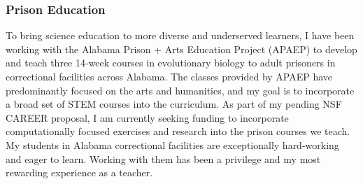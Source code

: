 \subsubsection*{Prison Education}
To bring science education to more diverse and underserved learners,
I have been working with
the Alabama Prison + Arts Education Project (APAEP) to develop and teach three
14-week courses in evolutionary biology to adult prisoners in correctional
facilities across Alabama.
The classes provided by APAEP have predominantly focused on the
arts and humanities, and
my
goal is to incorporate a broad set of STEM courses into the
curriculum.
As part of my pending NSF CAREER proposal, I am currently
seeking funding to incorporate computationally focused
exercises and research into the prison courses we teach.
My students in Alabama correctional facilities are exceptionally hard-working
and eager to learn.
Working with them has been a privilege and my most rewarding experience as a
teacher.


